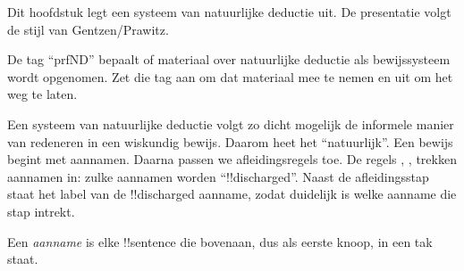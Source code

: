 \documentclass[openany]{memoir}
\begin{document}
      {}
      {}

\begin{editorial}
Dit hoofdstuk legt een systeem van natuurlijke deductie uit. De
presentatie volgt de stijl van Gentzen/Prawitz.
  
De tag ``prfND'' bepaalt of materiaal over natuurlijke deductie als
bewijssysteem wordt opgenomen. Zet die tag aan om dat materiaal mee te
nemen en uit om het weg te laten.
\end{editorial}












\endgroup

\begingroup
\def\olfilename{OLP-0085}
\def\olfilepath{content/first-order-logic/natural-deduction/}
\hypertarget{unit-OLP-0085}{}



      {}
      {}


\begin{explain}
Een systeem van natuurlijke deductie volgt zo dicht mogelijk de
informele manier van redeneren in een wiskundig bewijs. Daarom heet
het ``natuurlijk''. Een bewijs begint met aannamen. Daarna passen we
afleidingsregels toe. De regels \Intro{\lnot}, \Intro{\lif},
 trekken
aannamen in: zulke aannamen worden ``!!{discharged}''. Naast de
afleidingsstap staat het label van de !!{discharged} aanname, zodat
duidelijk is welke aanname die stap intrekt.
\end{explain}

\begin{defn}[Aanname]
Een \emph{aanname} is elke !!{sentence} die bovenaan, dus als eerste
knoop, in een tak staat.
\end{defn}
\end{document}
